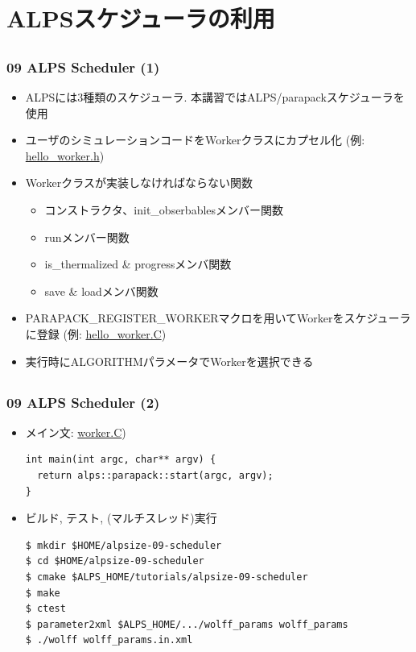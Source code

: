\section{ALPSスケジューラの利用}

\subsection*{\redm\whitem\greenb}
\begin{frame}[fragile]
  \frametitle{09 ALPS Scheduler (1)}
  \begin{itemize}
    \item ALPSには3種類のスケジューラ. 本講習ではALPS/parapackスケジューラを使用
    \item ユーザのシミュレーションコードをWorkerクラスにカプセル化 (例: \href{https://github.com/cmsi/alps-tutorial/blob/develop/alpsize/09-hello_worker.h}{hello\_worker.h})
    \item Workerクラスが実装しなければならない関数
      \begin{itemize}
        \item コンストラクタ、init\_obserbablesメンバー関数
        \item runメンバー関数
        \item is\_thermalized \& progressメンバ関数
        \item save \& loadメンバ関数
      \end{itemize}
    \item PARAPACK\_REGISTER\_WORKERマクロを用いてWorkerをスケジューラに登録 (例: \href{https://github.com/cmsi/alps-tutorial/blob/develop/alpsize/09-hello_worker.C}{hello\_worker.C})
    \item 実行時にALGORITHMパラメータでWorkerを選択できる
  \end{itemize}
\end{frame}

\subsection*{\redm\whitem\greenb}
\begin{frame}[fragile]
  \frametitle{09 ALPS Scheduler (2)}
  \begin{itemize}
    \item メイン文: \href{https://github.com/cmsi/alps-tutorial/blob/develop/alpsize/09-wolff.C}{worker.C})
\begin{lstlisting}
int main(int argc, char** argv) {
  return alps::parapack::start(argc, argv);
}
\end{lstlisting}
    \item ビルド, テスト, (マルチスレッド)実行
\begin{lstlisting}
$ mkdir $HOME/alpsize-09-scheduler
$ cd $HOME/alpsize-09-scheduler
$ cmake $ALPS_HOME/tutorials/alpsize-09-scheduler
$ make
$ ctest
$ parameter2xml $ALPS_HOME/.../wolff_params wolff_params
$ ./wolff wolff_params.in.xml
\end{lstlisting}
  \end{itemize}
\end{frame}

